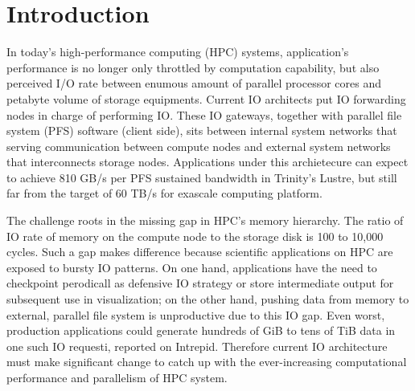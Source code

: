 \section{Introduction}

In today's high-performance computing (HPC) systems, application's performance
is no longer only throttled by computation capability, but also perceived I/O rate between
enumous amount of parallel processor cores and petabyte volume of storage equipments.
Current IO architects put IO forwarding nodes in charge of performing IO.
These IO gateways, together with parallel file system (PFS) software (client side), sits
between internal system networks that serving communication between compute nodes
and external system networks that interconnects storage nodes\cite{Ross:IOSystem}.
Applications under this archietecure can expect to achieve
810 GB/s per PFS sustained bandwidth in Trinity's Lustre\cite{TrinitySystem},
but still far from the target of 60 TB/s for exascale computing platform\cite{Shalf:HPCCS:2010}.

The challenge roots in the missing gap in HPC's memory hierarchy.
The ratio of IO rate of memory on the compute node to the storage disk
is 100 to 10,000 cycles\cite{TrinitySystem}.
Such a gap makes difference because scientific applications on HPC are exposed to
bursty IO patterns\cite{Carns:MSST:2011, Kim:PDSW:2010}.
On one hand, applications have the need to checkpoint perodicall as
defensive IO strategy\cite{Latham:CSD:2012, Naik:ICPPW:2009, Dennis:CUG:2009}
or store intermediate output for subsequent use in visualization;
on the other hand, pushing data from memory to external, parallel file system is
unproductive due to this IO gap.
Even worst, production applications could generate hundreds of GiB to tens of TiB data
in one such IO requesti, reported on Intrepid\cite{Liu:MSST:2012}.
Therefore current IO architecture must make significant change to catch up with
the ever-increasing computational performance and parallelism of HPC system.

